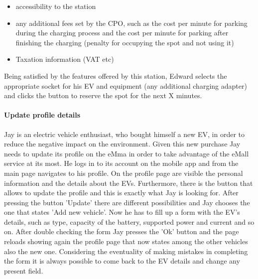 \begin{itemize}
    \item accessibility to the station
    \item any additional fees set by the CPO, such as the cost per minute for parking during the charging process and the cost per minute for parking after finishing the charging (penalty for occupying the spot and not using it)
    \item Taxation information (VAT etc)
\end{itemize}
Being satisfied by the features offered by this station, Edward selects the appropriate socket for his EV and equipment (any additional charging adapter) and clicks the button to reserve the spot for the next X minutes.


\paragraph{Update profile details}
Jay is an electric vehicle enthusiast, who bought himself a new EV, in order to reduce the negative impact on the environment. Given this new purchase Jay needs to update its profile on the eMma in order to take advantage of the eMall service at its most. He logs in to its account on the mobile app and from the main page navigates to his profile. On the profile page are visible the personal information and the details about the EVs. Furthermore, there is the button that allows to update the profile and this is exactly what Jay is looking for. After pressing the button 'Update' there are different possibilities and Jay chooses the one that states 'Add new vehicle'. Now he has to fill up a form with the EV's details, such as type, capacity of the battery, supported power and current and so on. After double checking the form Jay presses the 'Ok' button and the page reloads showing again the profile page that now states among the other vehicles also the new one. Considering the eventuality of making mistakes in completing the form it is always possible to come back to the EV details and change any present field.

